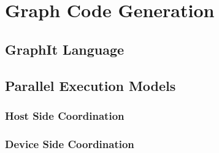 
\section{Graph Code Generation} \label{sec:method}

\subsection{GraphIt Language}

\subsection{Parallel Execution Models}

\subsubsection{Host Side Coordination}

\subsubsection{Device Side Coordination}